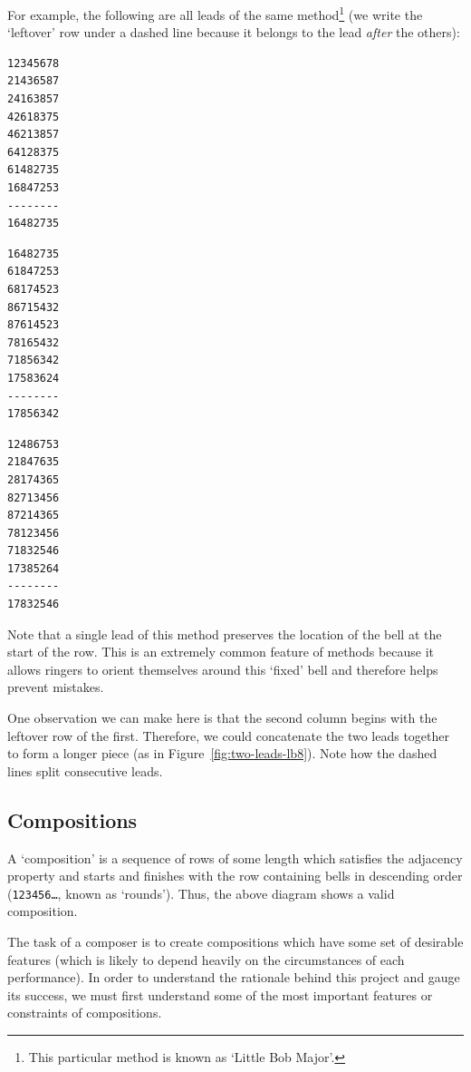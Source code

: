 \documentclass[12pt]{article}
\newcommand{\row}[1]{\texttt{#1}}
\begin{document}
For example, the following are all leads of the same method\footnote{This particular method is known
as `Little Bob Major'.} (we write the `leftover' row under a dashed line because it belongs to the
lead \emph{after} the others):

\begin{multicols}{3}

\centering
\begin{BVerbatim}
12345678
21436587
24163857
42618375
46213857
64128375
61482735
16847253
--------
16482735
\end{BVerbatim}

\centering
\begin{BVerbatim}
16482735
61847253
68174523
86715432
87614523
78165432
71856342
17583624
--------
17856342
\end{BVerbatim}

\centering
\begin{BVerbatim}
12486753
21847635
28174365
82713456
87214365
78123456
71832546
17385264
--------
17832546
\end{BVerbatim}

\end{multicols}

Note that a single lead of this method preserves the location of the bell at the start of the
row.  This is an extremely common feature of methods because it allows ringers to orient
themselves around this `fixed' bell and therefore helps prevent mistakes.

One observation we can make here is that the second column begins with the leftover row of the
first.  Therefore, we could concatenate the two leads together to form a longer piece (as in
Figure~\ref{fig:two-leads-lb8}). Note how the dashed lines split consecutive leads.

\subsection{Compositions}

A `composition' is a sequence of rows of some length which satisfies the adjacency property and
starts and finishes with the row containing bells in descending order (\row{123456\ldots}, known as
`rounds').  Thus, the above diagram shows a valid composition.

The task of a composer is to create compositions which have some set of desirable features (which is
likely to depend heavily on the circumstances of each performance).  In order to understand the
rationale behind this project and gauge its success, we must first understand some of the most
important features or constraints of compositions.
\end{document}
